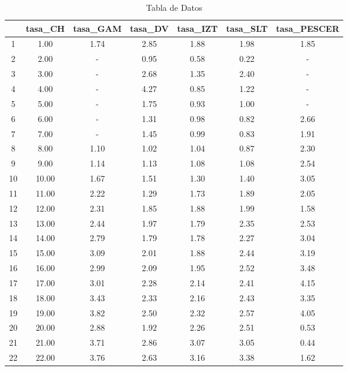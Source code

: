 \documentclass{article}
\begin{document}
\begin{table}
\centering
\begin{tabular}{|c|c|c|c|c|c|c|}
\hline
 & tasa\_CH & tasa\_GAM & tasa\_DV & tasa\_IZT & tasa\_SLT & tasa\_PESCER \\
\hline
1 & 1.00 & 1.74 & 2.85 & 1.88 & 1.98 & 1.85 \\
2 & 2.00 & - & 0.95 & 0.58 & 0.22 & - \\
3 & 3.00 & - & 2.68 & 1.35 & 2.40 & - \\
4 & 4.00 & - & 4.27 & 0.85 & 1.22 & - \\
5 & 5.00 & - & 1.75 & 0.93 & 1.00 & - \\
6 & 6.00 & - & 1.31 & 0.98 & 0.82 & 2.66 \\
7 & 7.00 & - & 1.45 & 0.99 & 0.83 & 1.91 \\
8 & 8.00 & 1.10 & 1.02 & 1.04 & 0.87 & 2.30 \\
9 & 9.00 & 1.14 & 1.13 & 1.08 & 1.08 & 2.54 \\
10 & 10.00 & 1.67 & 1.51 & 1.30 & 1.40 & 3.05 \\
11 & 11.00 & 2.22 & 1.29 & 1.73 & 1.89 & 2.05 \\
12 & 12.00 & 2.31 & 1.85 & 1.88 & 1.99 & 1.58 \\
13 & 13.00 & 2.44 & 1.97 & 1.79 & 2.35 & 2.53 \\
14 & 14.00 & 2.79 & 1.79 & 1.78 & 2.27 & 3.04 \\
15 & 15.00 & 3.09 & 2.01 & 1.88 & 2.44 & 3.19 \\
16 & 16.00 & 2.99 & 2.09 & 1.95 & 2.52 & 3.48 \\
17 & 17.00 & 3.01 & 2.28 & 2.14 & 2.41 & 4.15 \\
18 & 18.00 & 3.43 & 2.33 & 2.16 & 2.43 & 3.35 \\
19 & 19.00 & 3.82 & 2.50 & 2.32 & 2.57 & 4.05 \\
20 & 20.00 & 2.88 & 1.92 & 2.26 & 2.51 & 0.53 \\
21 & 21.00 & 3.71 & 2.86 & 3.07 & 3.05 & 0.44 \\
22 & 22.00 & 3.76 & 2.63 & 3.16 & 3.38 & 1.62 \\
\hline
\end{tabular}
\caption{Tabla de Datos}
\label{tab:datos3}
\end{table}
\end{document}
